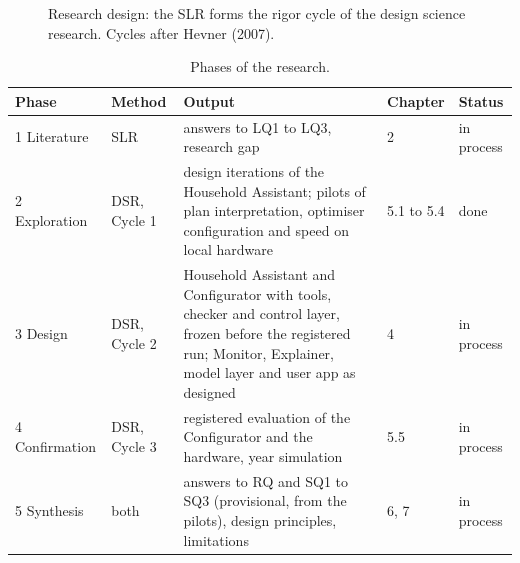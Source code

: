 \documentclass[12pt,a4paper]{report}
\begin{document}
\begin{figure}[htbp]
\centering
{}
\caption{Research design: the SLR forms the rigor cycle of the design
science research. Cycles after Hevner (2007).}
\label{fig:method}
\end{figure}

\begin{table}[htbp]
\caption{Phases of the research.}
\label{tab:phases}
\small
\begin{tabularx}{\textwidth}{@{}p{2.6cm}p{2.4cm}Xp{1.6cm}p{1.6cm}@{}}
\toprule
Phase & Method & Output & Chapter & Status \\
\midrule
1 Literature & SLR & answers to LQ1 to LQ3, research gap & 2 & in process \\
2 Exploration & DSR, Cycle 1 & design iterations of the Household Assistant; pilots of plan interpretation, optimiser configuration and speed on local hardware & 5.1 to 5.4 & done \\
3 Design & DSR, Cycle 2 & Household Assistant and Configurator with tools, checker and control layer, frozen before the registered run; Monitor, Explainer, model layer and user app as designed & 4 & in process \\
4 Confirmation & DSR, Cycle 3 & registered evaluation of the Configurator and the hardware, year simulation & 5.5 & in process \\
5 Synthesis & both & answers to RQ and SQ1 to SQ3 (provisional, from the pilots), design principles, limitations & 6, 7 & in process \\
\bottomrule
\end{tabularx}
\end{table}
\end{document}
